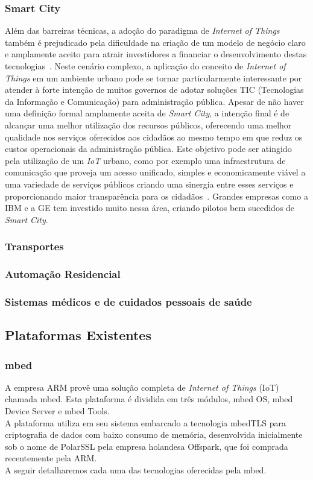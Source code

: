 \subsubsection{Smart City}
Além das barreiras técnicas, a adoção do paradigma de \textit{Internet of Things} também é prejudicado
pela dificuldade na criação de um modelo de negócio claro e amplamente aceito para atrair investidores
a financiar o desenvolvimento destas tecnologias~\cite{RePEc:zbw:itse13:88475}.
Neste cenário complexo, a aplicação do conceito de \textit{Internet of Things} em um ambiente urbano
pode se tornar particularmente interessante por atender à forte intenção de muitos governos de adotar
soluções TIC (Tecnologias da Informação e Comunicação) para administração pública.
Apesar de não haver uma definição formal amplamente aceita de \textit{Smart City}, a intenção final é de
alcançar uma melhor utilização dos recursos públicos, oferecendo uma melhor qualidade nos serviços oferecidos
aos cidadãos ao mesmo tempo em que reduz os custos operacionais da administração pública. Este objetivo
pode ser atingido pela utilização de um \textit{IoT} urbano, como por exemplo uma infraestrutura de
comunicação que proveja um acesso unificado, simples e economicamente viável a uma variedade
de serviços públicos criando uma sinergia entre esses serviços e proporcionando maior transparência
para os cidadãos~\cite{IoTSmart2014}. Grandes empresas como a IBM e a GE tem investido muito
nessa área, criando pilotos bem sucedidos de \textit{Smart City}.

\subsubsection{Transportes}
\subsubsection{Automação Residencial}
\subsubsection{Sistemas médicos e de cuidados pessoais de saúde}

\subsection{Plataformas Existentes}
\label{sec:IoTPlataformas}

\subsubsection{mbed}
A empresa ARM provê uma solução completa de \textit{Internet of Things} (IoT) chamada mbed\cite{mbed}. Esta plataforma é dividida em três módulos, mbed OS, mbed Device Server e mbed Tools.\\
A plataforma utiliza em seu sistema embarcado a tecnologia mbedTLS para criptografia de dados com baixo consumo de memória, desenvolvida inicialmente sob o nome de PolarSSL pela empresa holandesa Offspark, que foi comprada recentemente pela ARM.\\
A seguir detalharemos cada uma das tecnologias oferecidas pela mbed.\\

